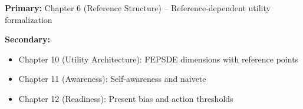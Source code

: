 \begin{tcolorbox}[colback=green!5!white,colframe=green!75!black,title=Chapter Linkage]
\textbf{Primary:} Chapter 6 (Reference Structure) -- Reference-dependent utility formalization

\textbf{Secondary:}
\begin{itemize}
    \item Chapter 10 (Utility Architecture): FEPSDE dimensions with reference points
    \item Chapter 11 (Awareness): Self-awareness and naivete
    \item Chapter 12 (Readiness): Present bias and action thresholds
\end{itemize}
\end{tcolorbox}

\begin{abstract}
This appendix integrates Matthew Rabin's foundational contributions to behavioral economics into the Evidence-Based Framework. Rabin's work provides rigorous theoretical foundations for reference-dependent preferences (with Kőszegi), present bias and self-control (with O'Donoghue), belief biases (law of small numbers), and social preferences (with Charness). We formalize six core axioms (RA-1 to RA-6) that connect his theoretical innovations to EBF. Key parameters include the projection bias coefficient ($\alpha_{proj} = 0.4$), present bias ($\beta = 0.7$), and loss aversion in reference-dependent utility ($\lambda = 2.0$). John Bates Clark Medal 2001; MacArthur Fellowship.
\end{abstract}

